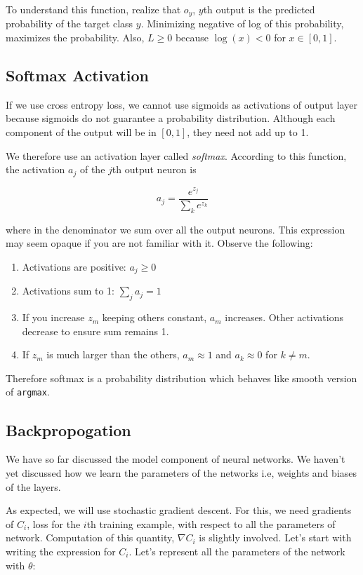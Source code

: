 \documentclass[a4paper]{tufte-handout}
\begin{document}
To understand this function, realize that \(o_y\), $y$th output is the predicted
probability of the target class \(y\). Minimizing negative of log of
this probability, maximizes the probability. Also, \(L \geq 0\) because
\(\log(x) < 0\) for \(x \in [0, 1]\).

\subsection{Softmax Activation}

If we use cross entropy loss, we cannot use sigmoids as activations of
output layer because sigmoids do not guarantee a probability
distribution. Although each component of the output will be in \([0, 1]\),
they need not add up to 1.

We therefore use an activation layer called \emph{softmax}. According to
this function, the activation \(a_j\) of the \(j\)th output neuron is

\[ a_j = \frac{e^{z_j}}{\sum_k e^{z_k}} \]

where in the denominator we sum over all the output neurons.
This expression may seem opaque if you are not familiar with it. Observe
the following:

\begin{enumerate}
\item
  Activations are positive: \(a_j \geq 0\)
\item
  Activations sum to 1: \(\sum_j a_j = 1\)
\item
  If you increase \(z_m\) keeping others constant, \(a_m\) increases.
  Other activations decrease to ensure sum remains 1.
\item
  If \(z_m\) is much larger than the others, \(a_m \approx 1\) and
  \(a_k \approx 0\) for \(k \neq m\).
\end{enumerate}

Therefore softmax is a probability distribution which behaves like
smooth version of \texttt{argmax}.

\subsection{Backpropogation}\label{backpropogation}

We have so far discussed the model component of neural networks. We
haven't yet discussed how we learn the parameters of the networks 
i.e, weights and biases of the layers.

As expected, we will use stochastic gradient descent. For this, we need
gradients of \(C_i\), loss for the \(i\)th training example,  
with respect to all the parameters of network. Computation
of this quantity, \(\nabla C_i\) is slightly involved. Let's start with
writing the expression for \(C_i\). Let's represent all the parameters
of the network with \(\theta\):
\end{document}
